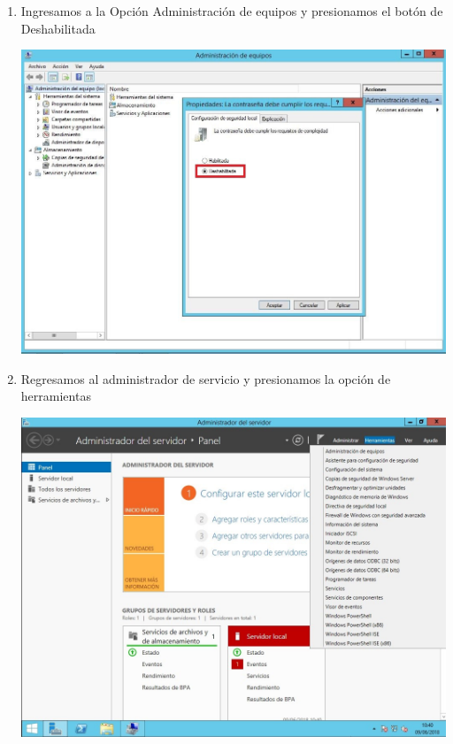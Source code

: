 \begin{enumerate}[1.]
	\item Ingresamos a la Opci\'on Administraci\'on de equipos y presionamos el bot\'on de Deshabilitada\\
	\begin{center}
	\includegraphics[width=15cm]{./Imagenes/img3} 
	\end{center}

	\item Regresamos al administrador de servicio y presionamos la opci\'on de herramientas\\
	\begin{center}
	\includegraphics[width=15cm]{./Imagenes/img4} 
	\end{center}


\end{enumerate}
